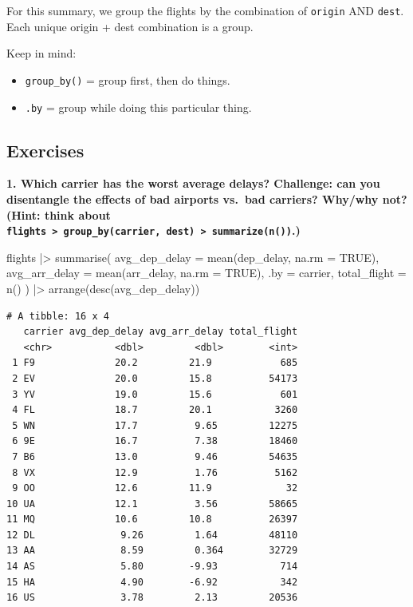 \documentclass[
  letterpaper,
  DIV=11,
  numbers=noendperiod]{scrreprt}
\newenvironment{Shaded}{\begin{snugshade}}{\end{snugshade}}
\newcommand{\AttributeTok}[1]{\textcolor[rgb]{0.40,0.45,0.13}{#1}}
\newcommand{\ConstantTok}[1]{\textcolor[rgb]{0.56,0.35,0.01}{#1}}
\newcommand{\FunctionTok}[1]{\textcolor[rgb]{0.28,0.35,0.67}{#1}}
\newcommand{\NormalTok}[1]{\textcolor[rgb]{0.00,0.23,0.31}{#1}}
\newcommand{\SpecialCharTok}[1]{\textcolor[rgb]{0.37,0.37,0.37}{#1}}
\providecommand{\tightlist}{%
  \setlength{\itemsep}{0pt}\setlength{\parskip}{0pt}}
\begin{document}
For this summary, we group the flights by the combination of
\texttt{origin} AND \texttt{dest}. Each unique origin + dest combination
is a group.

Keep in mind:

\begin{itemize}
\tightlist
\item
  \texttt{group\_by()} = group first, then do things.
\item
  \texttt{.by} = group while doing this particular thing.
\end{itemize}

\subsection{Exercises}\label{exercises-6}

\textbf{1. Which carrier has the worst average delays? Challenge: can
you disentangle the effects of bad airports vs.~bad carriers? Why/why
not? (Hint: think about
\texttt{flights\ \textbar{}\textgreater{}\ group\_by(carrier,\ dest)\ \textbar{}\textgreater{}\ summarize(n())}.)}

\begin{Shaded}
\begin{Highlighting}[]
\NormalTok{flights }\SpecialCharTok{|\textgreater{}}
  \FunctionTok{summarise}\NormalTok{(}
    \AttributeTok{avg\_dep\_delay =} \FunctionTok{mean}\NormalTok{(dep\_delay, }\AttributeTok{na.rm =} \ConstantTok{TRUE}\NormalTok{),}
    \AttributeTok{avg\_arr\_delay =} \FunctionTok{mean}\NormalTok{(arr\_delay, }\AttributeTok{na.rm =} \ConstantTok{TRUE}\NormalTok{),}
    \AttributeTok{.by =}\NormalTok{ carrier,}
    \AttributeTok{total\_flight =} \FunctionTok{n}\NormalTok{()}
\NormalTok{  ) }\SpecialCharTok{|\textgreater{}}
  \FunctionTok{arrange}\NormalTok{(}\FunctionTok{desc}\NormalTok{(avg\_dep\_delay))}
\end{Highlighting}
\end{Shaded}

\begin{verbatim}
# A tibble: 16 x 4
   carrier avg_dep_delay avg_arr_delay total_flight
   <chr>           <dbl>         <dbl>        <int>
 1 F9              20.2         21.9            685
 2 EV              20.0         15.8          54173
 3 YV              19.0         15.6            601
 4 FL              18.7         20.1           3260
 5 WN              17.7          9.65         12275
 6 9E              16.7          7.38         18460
 7 B6              13.0          9.46         54635
 8 VX              12.9          1.76          5162
 9 OO              12.6         11.9             32
10 UA              12.1          3.56         58665
11 MQ              10.6         10.8          26397
12 DL               9.26         1.64         48110
13 AA               8.59         0.364        32729
14 AS               5.80        -9.93           714
15 HA               4.90        -6.92           342
16 US               3.78         2.13         20536
\end{verbatim}
\end{document}
